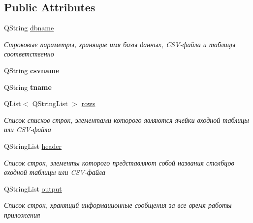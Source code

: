 \subsection*{Public Attributes}
\begin{DoxyCompactItemize}
\item 
Q\+String \hyperlink{classConverterModel_ab75f6b2e5a474bbe7fcbf9e59622b361}{dbname}\hypertarget{classConverterModel_ab75f6b2e5a474bbe7fcbf9e59622b361}{}\label{classConverterModel_ab75f6b2e5a474bbe7fcbf9e59622b361}

\begin{DoxyCompactList}\small\item\em Строковые параметры, хранящие имя базы данных, C\+S\+V-\/файла и таблицы соответственно \end{DoxyCompactList}\item 
Q\+String {\bfseries csvname}\hypertarget{classConverterModel_ab4dce94d79d91c492b001ef7bcca5ba8}{}\label{classConverterModel_ab4dce94d79d91c492b001ef7bcca5ba8}

\item 
Q\+String {\bfseries tname}\hypertarget{classConverterModel_a4b13b3ea842605312eac9c09812344c4}{}\label{classConverterModel_a4b13b3ea842605312eac9c09812344c4}

\item 
Q\+List$<$ Q\+String\+List $>$ \hyperlink{classConverterModel_a7841c23fa3fa3f96743c4e4e21b56aaa}{rows}\hypertarget{classConverterModel_a7841c23fa3fa3f96743c4e4e21b56aaa}{}\label{classConverterModel_a7841c23fa3fa3f96743c4e4e21b56aaa}

\begin{DoxyCompactList}\small\item\em Список списков строк, элементами которого являются ячейки входной таблицы или C\+S\+V-\/файла \end{DoxyCompactList}\item 
Q\+String\+List \hyperlink{classConverterModel_a0f16570da8c0cf58d6ad6bc8c981c1d9}{header}\hypertarget{classConverterModel_a0f16570da8c0cf58d6ad6bc8c981c1d9}{}\label{classConverterModel_a0f16570da8c0cf58d6ad6bc8c981c1d9}

\begin{DoxyCompactList}\small\item\em Список строк, элементы которого представляют собой названия столбцов входной таблицы или C\+S\+V-\/файла \end{DoxyCompactList}\item 
Q\+String\+List \hyperlink{classConverterModel_a03a814b195196ac9a897f708b2f55e0a}{output}\hypertarget{classConverterModel_a03a814b195196ac9a897f708b2f55e0a}{}\label{classConverterModel_a03a814b195196ac9a897f708b2f55e0a}

\begin{DoxyCompactList}\small\item\em Список строк, хранящий информационные сообщения за все время работы приложения \end{DoxyCompactList}\end{DoxyCompactItemize}


